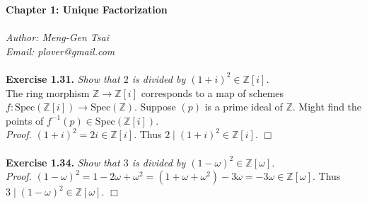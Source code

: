 \documentclass{article}
\begin{document}
\textbf{\Large Chapter 1: Unique Factorization} \\\\



\emph{Author: Meng-Gen Tsai} \\
\emph{Email: plover@gmail.com} \\\\




\textbf{Exercise 1.31.}
\emph{Show that $2$ is divided by $(1+i)^2 \in \mathbb{Z}[i]$.} \\

The ring morphism $\mathbb{Z} \rightarrow \mathbb{Z}[i]$
corresponds to a map of schemes
$f: \text{Spec}(\mathbb{Z}[i]) \rightarrow \text{Spec}(\mathbb{Z})$.
Suppose $(p)$ is a prime ideal of $\mathbb{Z}$.
Might find the points of $f^{-1}(p) \in \text{Spec}(\mathbb{Z}[i])$. \\

\emph{Proof.}
$(1+i)^2 = 2i \in \mathbb{Z}[i]$.
Thus $2 \mid (1+i)^2 \in \mathbb{Z}[i]$.
$\Box$ \\\\



\textbf{Exercise 1.34.}
\emph{Show that $3$ is divided by $(1-\omega)^2 \in \mathbb{Z}[\omega]$.} \\

\emph{Proof.}
$(1 - \omega)^2
= 1 - 2\omega + \omega^2
= (1 + \omega + \omega^2) - 3 \omega
= - 3 \omega \in \mathbb{Z}[\omega]$.
Thus $3 \mid (1 - \omega)^2 \in \mathbb{Z}[\omega]$.
$\Box$ \\\\
\end{document}
